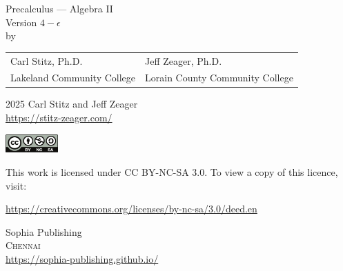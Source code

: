 \begin{titlepage}
\begin{center}

\vspace*{0.1\paperheight}

\Huge Precalculus --- Algebra II  \\ \vspace{.1in} \large Version $4 - \epsilon$  \\ \vspace{.25in} \large by

\vspace{0.1\paperheight}

\begin{tabularx}{0.953\linewidth}{YY} Carl Stitz, Ph.D. &  Jeff Zeager, Ph.D. \\ Lakeland Community College & Lorain County Community College \\\end{tabularx}

\vfill

\begin{center}
    \sophia
\end{center}

\end{center}
\end{titlepage}

\begingroup
\footnotesize
\setlength{\parindent}{0pt}
\setlength{\parskip}{\baselineskip}

\textcopyright{} 2025 Carl Stitz and Jeff Zeager \\
\url{https://stitz-zeager.com/}

\includegraphics[height=20pt]{../by-nc-sa.pdf}

This work is licensed under CC BY-NC-SA 3.0. To view a copy of this licence,
visit:

\url{https://creativecommons.org/licenses/by-nc-sa/3.0/deed.en}

\vfill

Sophia Publishing \\
\textsc{Chennai} \\
\url{https://sophia-publishing.github.io/} \\
\endgroup

%

\thispagestyle{empty}

